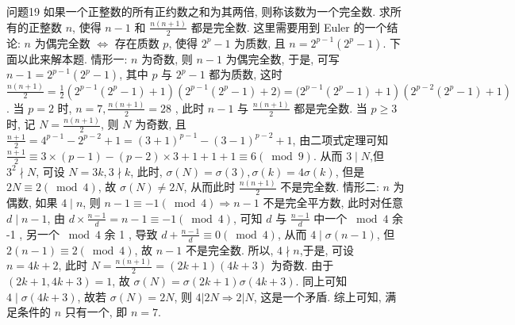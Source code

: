 问题19 如果一个正整数的所有正约数之和为其两倍, 则称该数为一个完全数.
求所有的正整数 $n$, 使得 $n-1$ 和 $\frac{n(n+1)}{2}$ 都是完全数.
这里需要用到 Euler 的一个结论: $n$ 为偶完全数 $\Leftrightarrow$ 存在质数 $p$, 使得 $2^p-1$ 为质数, 且 $n=2^{p-1}\left(2^p-1\right)$. 下面以此来解本题.
情形一: $n$ 为奇数, 则 $n-1$ 为偶完全数, 于是, 可写 $n-1=2^{p-1}\left(2^p-1\right)$, 其中 $p$ 与 $2^p-1$ 都为质数, 这时 $\frac{n(n+1)}{2}=\frac{1}{2}\left(2^{p-1}\left(2^p-1\right)+1\right)\left(2^{p-1}\left(2^p-1\right)+ 2)= (2^{p-1}\left(2^p-1\right)+1\right)\left(2^{p-2}\left(2^p-1\right)+1\right)$. 当 $p=2$ 时, $n=7, \frac{n(n+1)}{2}=  28$ , 此时 $n-1$ 与 $\frac{n(n+1)}{2}$ 都是完全数.
当 $p \geqslant 3$ 时, 记 $N=\frac{n(n+1)}{2}$, 则 $N$ 为奇数, 且 $\frac{n+1}{2}=4^{p-1}-2^{p-2}+1=(3+1)^{p-1}-(3-1)^{p-2}+1$, 由二项式定理可知 $\frac{n+1}{2} \equiv 3 \times(p-1)-(p-2) \times 3+1+1+1 \equiv 6(\bmod 9)$. 从而 $3 \mid N$,但 $3^2 \nmid N$, 可设 $N=3 k, 3 \nmid k$, 此时, $\sigma(N)=\sigma(3), \sigma(k)=4 \sigma(k)$, 但是 $2 N \equiv 2(\bmod 4)$, 故 $\sigma(N) \neq 2 N$, 从而此时 $\frac{n(n+1)}{2}$ 不是完全数.
情形二: $n$ 为偶数, 如果 $4 \mid n$, 则 $n-1 \equiv-1(\bmod 4) \Rightarrow n-1$ 不是完全平方数, 此时对任意 $d \mid n-1$, 由 $d \times \frac{n-1}{d}=n-1 \equiv-1(\bmod 4)$, 可知 $d$ 与 $\frac{n-1}{d}$ 中一个 $\bmod 4$ 余 -1 , 另一个 $\bmod 4$ 余 1 , 导致 $d+\frac{n-1}{d} \equiv 0(\bmod 4)$, 从而 $4 \mid \sigma(n-1)$, 但 $2(n-1) \equiv 2(\bmod 4)$, 故 $n-1$ 不是完全数.
所以, $4 \nmid n$,于是, 可设 $n=4 k+2$, 此时 $N=\frac{n(n+1)}{2}=(2 k+1)(4 k+3)$ 为奇数.
由于 $(2 k+ 1,4 k+3)=1$, 故 $\sigma(N)=\sigma(2 k+1) \sigma(4 k+3)$. 同上可知 $4 \mid \sigma(4 k+3)$, 故若 $\sigma(N)=2 N$, 则 $4|2 N \Rightarrow 2| N$, 这是一个矛盾.
综上可知, 满足条件的 $n$ 只有一个, 即 $n=7$.


